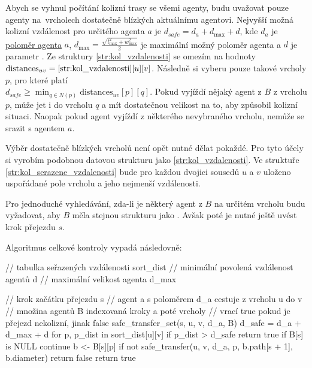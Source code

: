 Abych se vyhnul počítání kolizní trasy se všemi agenty,
budu uvažovat pouze agenty na~vrcholech dostatečně blízkých aktuálnímu agentovi.
Nejvyšší možná kolizní vzdálenost pro určitého agenta $a$ je $d_{safe} = d_a + d_{\max} + d$, kde $d_a$ je
\hyperref[par:polomer_agenta]{poloměr agenta} $a$,
$d_{\max} = \frac{\sqrt{l_{\max}^2 + w_{\max}^2}}{2}$ je maximální možný poloměr agenta a
$d$ je parametr .
Ze struktury \ref{str:kol_vzdalenosti} se omezím na hodnoty $\textrm{distances}_{uv} = \ref{str:kol_vzdalenosti}[u][v]$.
Následně si vyberu pouze takové vrcholy $p$, pro které platí\\
$d_{safe} \geq \min_{q\in N(p)} \textrm{distances}_{uv}[p][q]$.
Pokud vyjíždí nějaký agent z $B$ z vrcholu $p$, může jet i do vrcholu $q$ a
mít dostatečnou velikost na to, aby způsobil kolizní situaci.
Naopak pokud agent vyjíždí z některého nevybraného vrcholu, nemůže se srazit s agentem $a$.

Výběr dostatečně blízkých vrcholů není opět nutné dělat pokaždé.
Pro tyto účely si vyrobím podobnou datovou strukturu jako \ref{str:kol_vzdalenosti}.
Ve struktuře \ref{str:kol_serazene_vzdalenosti}
bude pro každou dvojici sousedů $u$ a $v$ uloženo uspořádané pole vrcholu a jeho nejmenší vzdálenosti.

Pro jednoduché vyhledávání, zda-li je některý agent z $B$ na určitém vrcholu budu vyžadovat,
aby $B$ měla stejnou strukturu jako .
Avšak poté je nutné ještě uvést krok přejezdu $s$.

Algoritmus celkové kontroly vypadá následovně:
\begin{code}[fontsize=\footnotesize]
// tabulka seřazených vzdálenosti sort_dist
// minimální povolená vzdálenost agentů d
// maximální velikost agenta d_max

// krok začátku přejezdu s
// agent a s poloměrem d_a cestuje z vrcholu u do v
// množina agentů B indexovaná kroky a poté vrcholy
// vrací true pokud je přejezd nekolizní, jinak false
safe_transfer_set(s, u, v, d_a, B)
	d_safe = d_a + d_max + d
	for p, p_dist in sort_dist[u][v]
		if p_dist > d_safe
			return true
		if B[s] is NULL
			continue
		b <- B[s][p]
		if not safe_transfer(u, v, d_a, p, b.path[s + 1], b.diameter)
			return false
	return true
\end{code}
